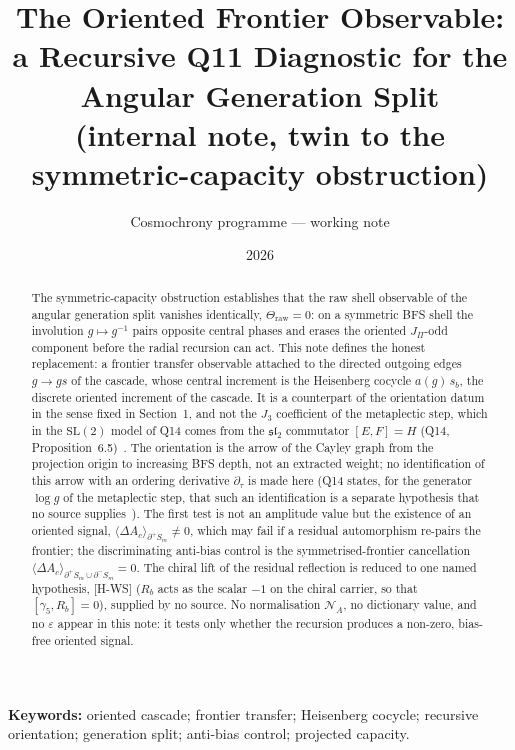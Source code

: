 \documentclass[11pt]{article}
\title{The Oriented Frontier Observable:
a Recursive Q11 Diagnostic for the Angular Generation Split\\[2pt]
\large (internal note, twin to the symmetric-capacity obstruction)}
\author{Cosmochrony programme --- working note}
\date{2026}
\begin{document}
  \maketitle

  \begin{abstract}
    The symmetric-capacity obstruction establishes that the raw shell observable of the angular generation
    split vanishes identically, $\Theta_{\mathrm{raw}}=0$: on a symmetric BFS shell the involution
    $g\mapsto g^{-1}$ pairs opposite central phases and erases the oriented $J_\Pi$-odd component before the
    radial recursion can act.
    This note defines the honest replacement: a frontier transfer observable attached to the directed
    outgoing edges $g\to gs$ of the cascade, whose central increment is the Heisenberg cocycle $a(g)\,s_b$,
    the discrete oriented increment of the cascade.
    It is a counterpart of the orientation datum in the sense fixed in Section~1, and not the $J_3$ coefficient
    of the metaplectic step, which in the $\mathrm{SL}(2)$ model of Q14 comes from the $\mathfrak{sl}_2$
    commutator $[E,F]=H$ (Q14, Proposition~6.5)~\cite{Beau2026q14}.
    The orientation is the arrow of the Cayley graph from the projection origin to increasing
    BFS depth, not an extracted weight; no identification of this arrow with an ordering derivative
    $\partial_\tau$ is made here (Q14 states, for the generator $\log g$ of the metaplectic step, that such an
    identification is a separate hypothesis that no source supplies~\cite{Beau2026q14}).
    The first test is not an amplitude value but the existence of an oriented signal,
    $\langle\Delta A_c\rangle_{\partial^+S_m}\neq 0$, which may fail if a residual automorphism re-pairs the
    frontier; the discriminating anti-bias control is the symmetrised-frontier cancellation
    $\langle\Delta A_c\rangle_{\partial^+S_m\cup\partial^-S_m}=0$.
    The chiral lift of the residual reflection is reduced to one named hypothesis, [H-WS] ($R_b$ acts as the scalar $-1$
    on the chiral carrier, so that $[\gamma_5,R_b]=0$), supplied by no source.
    No normalisation $\mathcal{N}_A$, no dictionary value, and no $\varepsilon$ appear in this note: it tests
    only whether the recursion produces a non-zero, bias-free oriented signal.
  \end{abstract}

  \textbf{Keywords:} oriented cascade; frontier transfer; Heisenberg cocycle; recursive orientation;
  generation split; anti-bias control; projected capacity.
\end{document}
